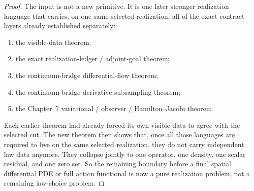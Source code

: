 \begin{proof}
The input is not a new primitive. It is one later stronger realization language
that carries, on one same selected realization, all of the exact contract
layers already established separately:
\begin{enumerate}
\item the visible-data theorem;
\item the exact realization-ledger / adjoint-goal theorem;
\item the continuum-bridge differential-flow theorem;
\item the continuum-bridge derivative-subsampling theorem;
\item the Chapter~7 variational / observer / Hamilton--Jacobi theorem.
\end{enumerate}
Each earlier theorem had already forced its own visible data to agree with
the selected cut. The new theorem then shows that, once all those languages
are required to live on the same selected realization, they do not carry
independent law data anymore. They collapse jointly to one operator, one
density, one scalar residual, and one zero set. So the remaining boundary
before a final spatial differential PDE or full action functional is now a
pure realization problem, not a remaining law-choice problem.
\end{proof}

